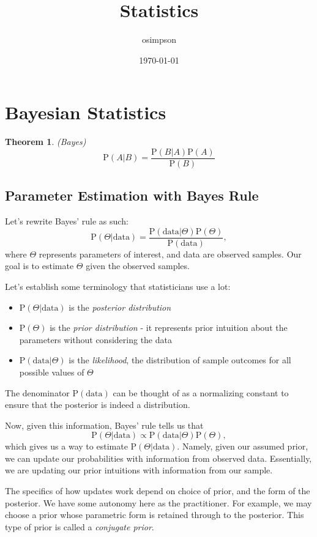 \documentclass[12pt]{article}
\title{Statistics}
\author{osimpson}
\date{\today}
\newtheorem{theorem}{Theorem}
\newcommand{\Prob}{\mathrm{P}}
\begin{document}
\maketitle

\section{Bayesian Statistics}

\begin{theorem} (Bayes)
    \begin{equation}
        \Prob(A|B) = \frac{\Prob(B|A)\Prob(A)}{\Prob(B)}
    \end{equation}
\end{theorem}

\subsection{Parameter Estimation with Bayes Rule}

Let's rewrite Bayes' rule as such:
\begin{equation}
    \Prob(\Theta|\text{data}) = \frac{\Prob(\text{data}|\Theta)\Prob(\Theta)}{\Prob(\text{data})},
\end{equation}
where $\Theta$ represents parameters of interest, and data are observed samples.
Our goal is to estimate $\Theta$ given the observed samples.

Let's establish some terminology that statisticians use a lot:
\begin{itemize}
    \item $\Prob(\Theta|\text{data})$ is the \emph{posterior distribution}
    \item $\Prob(\Theta)$ is the \emph{prior distribution} - it represents prior intuition about the parameters without considering the data
    \item $\Prob(\text{data}|\Theta)$ is the \emph{likelihood}, the distribution of sample outcomes for all possible values of $\Theta$
\end{itemize}

The denominator $\Prob(\text{data})$ can be thought of as a normalizing constant
to ensure that the posterior is indeed a distribution.

Now, given this information, Bayes' rule tells us that 
\begin{equation}
    \Prob(\Theta|\text{data}) \propto \Prob(\text{data}|\Theta)\Prob(\Theta),
\end{equation}
which gives us a way to estimate $\Prob(\Theta|\text{data})$.  Namely, given our
assumed prior, we can update our probabilities with information from observed data.
Essentially, we are updating our prior intuitions with information from our sample.

The specifics of how updates work depend on choice of prior, and the form of the
posterior.  We have some autonomy here as the practitioner.  For example, we may
choose a prior whose parametric form is retained through to the posterior.  This
type of prior is called a \emph{conjugate prior}.
\end{document}
